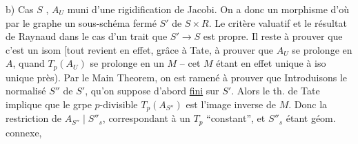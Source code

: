 
b) Cas $S$  , $A_U$ muni d'une rigidification de Jacobi. On a donc un morphisme
\margin{\deleted{$\unsure{\ell}$}}
d'où par le  graphe un sous-schéma fermé $S'$ de $S\times R$. Le critère valuatif et le résultat de Raynaud dans le cas d'un trait  que $S'\to S$ est propre. Il reste à prouver que c'est un isom [tout revient en effet, grâce à Tate, à prouver que $A_U$ se prolonge en $A$, quand $T_p(A_U)$ se prolonge en un $M$ -- cet $M$ étant en effet unique à iso unique près). Par le Main Theorem, on est ramené à prouver que   Introduisons le normalisé $S''$ de $S'$, qu'on suppose d'abord \uline{fini} sur $S'$. Alors le th. de Tate implique que le grpe $p$-divisible $T_p(A_{S''})$  est l'image inverse de  $M$. Donc la restriction de $A_{S''}\mid S''_s$, correspondant à un $T_p$ ``constant'', et $S''_s$ étant géom. connexe,
